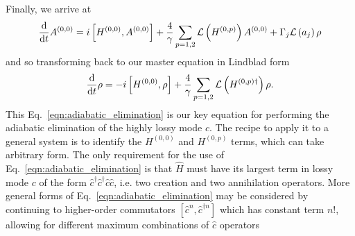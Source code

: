 \MT{----------------}

Finally, we arrive at 
\begin{equation}
\ddt A^{\left(0, 0\right)} = i \left[ H^{\left(0, 0\right)}, A^{\left(0, 0\right)}\right] + \frac{4}{\gamma} \sum_{p = {1, 2}} \mathcal{L}\left( H^{\left(0, p\right)} \right) A^{\left(0, 0\right)} + \Gamma_j \mathcal{L}\left(a_j\right) \rho %
\end{equation}
and so transforming back to our master equation in Lindblad form
\begin{equation}\label{eqn:adiabatic_elimination}
\frac{\mathrm{d}}{\mathrm{d}t} \rho = - i \left[ H^{\left(0, 0\right)}, \rho\right] + \frac{4}{\gamma} \sum_{p = 1, 2} \mathcal{L} \left(H^{\left(0, p\right)\dagger}\right) \rho.
\end{equation}
This Eq.~\ref{eqn:adiabatic_elimination} is our key equation for performing the adiabatic elimination of the highly lossy mode $c$. The recipe to apply it to a general system is to identify the $H^{\left(0, 0\right)}$ and $H^{\left(0, p\right)}$ terms, which can take arbitrary form. The only requirement for the use of Eq.~\ref{eqn:adiabatic_elimination} is that $\hat{H}$ must have its largest term in lossy mode $c$ of the form $\hat{c}^\dagger \hat{c}^\dagger \hat{c} \hat{c}$, i.e. two creation and two annihilation operators. More general forms of Eq.~\ref{eqn:adiabatic_elimination} may be considered by continuing to higher-order commutators $\left[ \hat{c}^n, \hat{c}^{\dagger n}\right]$ which has constant term $n!$, allowing for different maximum combinations of $\hat{c}$ operators 

